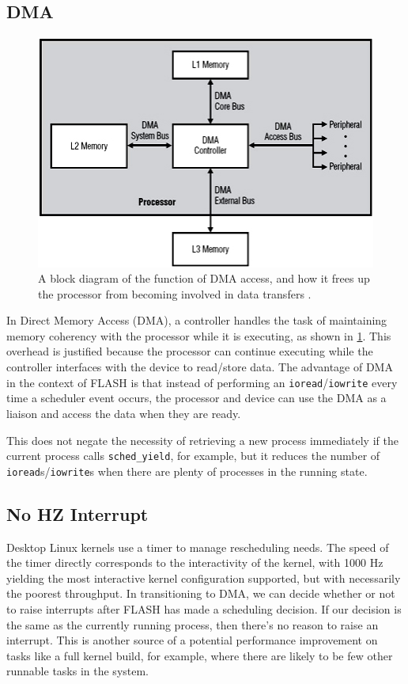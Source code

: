 \documentclass{sig-alternate-10pt}
\begin{document}
\subsection{DMA}
\begin{figure}
	\begin{center}
		\includegraphics[width=0.9\linewidth]{fig/dma.jpg}
		\caption{
			A block diagram of the function of DMA access, and how it frees up the processor from becoming involved in data transfers \protect\cite{fig:dma}.
		}
		\label{fig:dma_diag}
	\end{center}
\end{figure}
In Direct Memory Access (DMA), a controller handles the task of maintaining
memory coherency with the processor while it is executing, as shown in
\ref{fig:dma_diag}. This overhead is justified because the processor can
continue executing while the controller interfaces with the device to
read/store data. The advantage of DMA in the context of FLASH is that
instead of performing an \texttt{ioread}/\texttt{iowrite} every time a scheduler event occurs,
the processor and device can use the DMA as a liaison and access the data
when they are ready.

This does not negate the necessity of retrieving a new process immediately
if the current process calls \verb|sched_yield|, for example, but it reduces
the number of \texttt{ioread}s/\texttt{iowrite}s when there are plenty of processes in the
running state.

\subsection{No HZ Interrupt}
Desktop Linux kernels use a timer to manage rescheduling needs. The speed of the timer directly corresponds to the interactivity of the kernel, with 1000 Hz yielding the most interactive kernel configuration supported, but with necessarily the poorest throughput. In transitioning to DMA, we can decide whether or not to raise interrupts after FLASH has made a scheduling decision. If our decision is the same as the currently running process, then there's no reason to raise an interrupt. This is another source of a potential performance improvement on tasks like a full kernel build, for example, where there are likely to be few other runnable tasks in the system.
\end{document}

